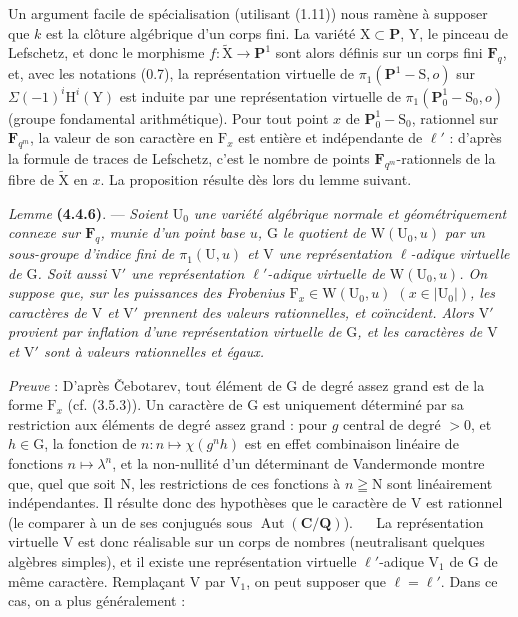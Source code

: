 \documentclass[11pt,leqno]{article}
\newcommand{\Page}[1]{\ifvmode\noindent\else\unskip\ \fi{\footnotesize\textcolor{gray}{[p.\,#1]}}\ \ignorespaces}
\begin{document}
Un argument facile de spécialisation (utilisant (1.11)) nous ramène à supposer que \(k\) est la clôture algébrique d’un corps fini. La variété \(\mathrm{X}\subset\mathbf{P}\), \(\mathrm{Y}\), le pinceau de Lefschetz, et donc le morphisme \(f:\widetilde{\mathrm{X}}\to\mathbf{P}^1\) sont alors définis sur un corps fini \(\mathbf{F}_q\), et, avec les notations (0.7), la représentation virtuelle de \(\pi_1(\mathbf{P}^1-\mathrm{S},o)\) sur \(\Sigma(-1)^i\mathrm{H}^i(\mathrm{Y})\) est induite par une représentation virtuelle de \(\pi_1(\mathbf{P}^1_0-\mathrm{S}_0,o)\) (groupe fondamental arithmétique). Pour tout point \(x\) de \(\mathbf{P}^1_0-\mathrm{S}_0\), rationnel sur \(\mathbf{F}_{q^m}\), la valeur de son caractère en \(\mathrm{F}_x\) est entière et indépendante de \(\ell'\) : d’après la formule de traces de Lefschetz, c’est le nombre de points \(\mathbf{F}_{q^m}\)-rationnels de la fibre de \(\widetilde{\mathrm{X}}\) en \(x\). La proposition résulte dès lors du lemme suivant.

\textit{Lemme} \textbf{(4.4.6)}. — \textit{Soient \(\mathrm{U}_0\) une variété algébrique normale et géométriquement connexe sur \(\mathbf{F}_q\), munie d’un point base \(u\), \(\mathrm{G}\) le quotient de \(\mathrm{W}(\mathrm{U}_0,u)\) par un sous-groupe d’indice fini de \(\pi_1(\mathrm{U},u)\) et \(\mathrm{V}\) une représentation \(\ell\)-adique virtuelle de \(\mathrm{G}\). Soit aussi \(\mathrm{V}'\) une représentation \(\ell'\)-adique virtuelle de \(\mathrm{W}(\mathrm{U}_0,u)\). On suppose que, sur les puissances des Frobenius \(\mathrm{F}_x\in\mathrm{W}(\mathrm{U}_0,u)\) \((x\in|\mathrm{U}_0|)\), les caractères de \(\mathrm{V}\) et \(\mathrm{V}'\) prennent des valeurs rationnelles, et coïncident. Alors \(\mathrm{V}'\) provient par inflation d’une représentation virtuelle de \(\mathrm{G}\), et les caractères de \(\mathrm{V}\) et \(\mathrm{V}'\) sont à valeurs rationnelles et égaux.}

\textit{Preuve} : D’après \v{C}ebotarev, tout élément de \(\mathrm{G}\) de degré assez grand est de la forme \(\mathrm{F}_x\) (cf. (3.5.3)). Un caractère de \(\mathrm{G}\) est uniquement déterminé par sa restriction aux éléments de degré assez grand : pour \(g\) central de degré \(>0\), et \(h\in\mathrm{G}\), la fonction de \(n:n\mapsto\chi(g^nh)\) est en effet combinaison linéaire de fonctions \(n\mapsto\lambda^n\), et la non-nullité d’un déterminant de Vandermonde montre que, quel que soit \(\mathrm{N}\), les restrictions de ces fonctions à \(n\geqq\mathrm{N}\) sont linéairement indépendantes. Il résulte donc des hypothèses que le caractère de \(\mathrm{V}\) est rationnel (le comparer à un de ses conjugués sous \(\operatorname{Aut}(\mathbf{C}/\mathbf{Q})\)).
\Page{230}
La représentation virtuelle \(\mathrm{V}\) est donc réalisable sur un corps de nombres (neutralisant quelques algèbres simples), et il existe une représentation virtuelle \(\ell'\)-adique \(\mathrm{V}_1\) de \(\mathrm{G}\) de même caractère. Remplaçant \(\mathrm{V}\) par \(\mathrm{V}_1\), on peut supposer que \(\ell=\ell'\). Dans ce cas, on a plus généralement :
\end{document}
